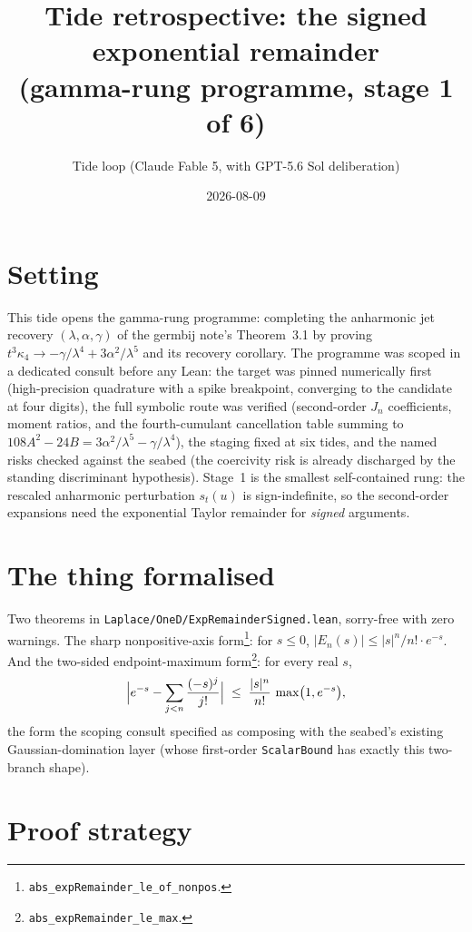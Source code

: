\documentclass[11pt]{article}
\title{Tide retrospective: the signed exponential remainder\\
(gamma-rung programme, stage 1 of 6)}
\author{Tide loop (Claude Fable 5, with GPT-5.6 Sol deliberation)}
\date{2026-08-09}
\begin{document}
\maketitle

\section{Setting}

This tide opens the gamma-rung programme: completing the anharmonic jet
recovery $(\lambda, \alpha, \gamma)$ of the germbij note's Theorem~3.1
by proving $t^3 \kappa_4 \to -\gamma/\lambda^4 + 3\alpha^2/\lambda^5$
and its recovery corollary. The programme was scoped in a dedicated
consult before any Lean: the target was pinned numerically first
(high-precision quadrature with a spike breakpoint, converging to the
candidate at four digits), the full symbolic route was verified
(second-order $J_n$ coefficients, moment ratios, and the
fourth-cumulant cancellation table summing to
$108A^2 - 24B = 3\alpha^2/\lambda^5 - \gamma/\lambda^4$), the staging
fixed at six tides, and the named risks checked against the seabed
(the coercivity risk is already discharged by the standing discriminant
hypothesis). Stage~1 is the smallest self-contained rung: the rescaled
anharmonic perturbation $s_t(u)$ is sign-indefinite, so the
second-order expansions need the exponential Taylor remainder for
\emph{signed} arguments.

\section{The thing formalised}

Two theorems in \texttt{Laplace/OneD/ExpRemainderSigned.lean},
sorry-free with zero warnings. The sharp nonpositive-axis
form\footnote{\texttt{abs\_expRemainder\_le\_of\_nonpos}.}: for
$s \leq 0$, $|E_n(s)| \leq |s|^n/n! \cdot e^{-s}$. And the two-sided
endpoint-maximum form\footnote{\texttt{abs\_expRemainder\_le\_max}.}:
for every real $s$,
\[
\Bigl| e^{-s} - \sum_{j<n} \frac{(-s)^j}{j!} \Bigr|
\;\leq\; \frac{|s|^n}{n!}\,\max\bigl(1, e^{-s}\bigr),
\]
the form the scoping consult specified as composing with the seabed's
existing Gaussian-domination layer (whose first-order
\texttt{ScalarBound} has exactly this two-branch shape).

\section{Proof strategy}
\end{document}
